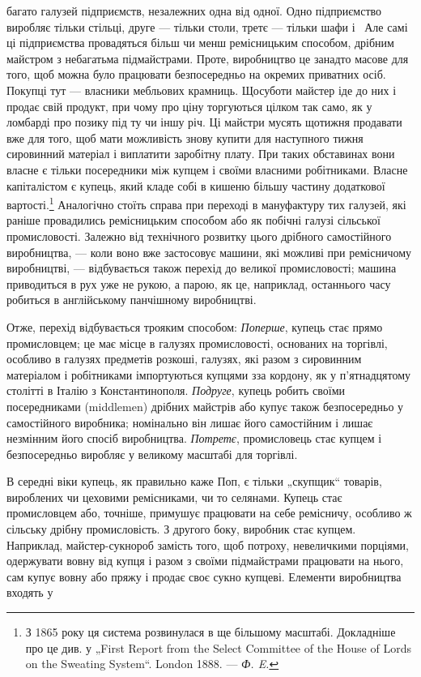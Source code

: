 \parcont{}  %
багато галузей підприємств, незалежних одна від одної. Одно
підприємство виробляє тільки стільці, друге — тільки столи,
третє — тільки шафи і~ Але самі ці підприємства провадяться
більш чи менш ремісницьким способом, дрібним майстром з небагатьма
підмайстрами. Проте, виробництво це занадто масове для
того, щоб можна було працювати безпосередньо на окремих
приватних осіб. Покупці тут — власники мебльових крамниць.
Щосуботи майстер іде до них і продає свій продукт, при чому
про ціну торгуються цілком так само, як у ломбарді про позику
під ту чи іншу річ. Ці майстри мусять щотижня продавати вже
для того, щоб мати можливість знову купити для наступного
тижня сировинний матеріал і виплатити заробітну плату. При
таких обставинах вони власне є тільки посередники між купцем
і своїми власними робітниками. Власне капіталістом є купець,
який кладе собі в кишеню більшу частину додаткової вартості.\footnote{
З 1865 року ця система розвинулася в ще більшому масштабі. Докладніше
про це див. у „First Report from the Select Committee of the House of Lords on
the Sweating System“. London 1888. — \emph{Ф. E.}
}
Аналогічно стоїть справа при переході в мануфактуру тих галузей,
які раніше провадились ремісницьким способом або як
побічні галузі сільської промисловості. Залежно від технічного
розвитку цього дрібного самостійного виробництва, — коли воно
вже застосовує машини, які можливі при ремісничому виробництві,
— відбувається також перехід до великої промисловості;
машина приводиться в рух уже не рукою, а парою, як це, наприклад,
останнього часу робиться в англійському панчішному
виробництві.

Отже, перехід відбувається трояким способом: \emph{Поперше},
купець стає прямо промисловцем; це має місце в галузях промисловості,
основаних на торгівлі, особливо в галузях предметів
розкоші, галузях, які разом з сировинним матеріалом і робітниками
імпортуються купцями зза кордону, як у п’ятнадцятому
столітті в Італію з Константинополя. \emph{Подруге}, купець робить
своїми посередниками (middlemen) дрібних майстрів або купує
також безпосередньо у самостійного виробника; номінально
він лишає його самостійним і лишає незмінним його спосіб виробництва.
\emph{Потретє}, промисловець стає купцем і безпосередньо
виробляє у великому масштабі для торгівлі.

В середні віки купець, як правильно каже Поп, є тільки
„скупщик“ товарів, вироблених чи цеховими ремісниками, чи то
селянами. Купець стає промисловцем або, точніше, примушує
працювати на себе ремісничу, особливо ж сільську дрібну промисловість.
З другого боку, виробник стає купцем. Наприклад,
майстер-сукнороб замість того, щоб потроху, невеличкими
порціями, одержувати вовну від купця і разом з своїми підмайстрами
працювати на нього, сам купує вовну або пряжу і
продає своє сукно купцеві. Елементи виробництва входять у
\parbreak{}  %
